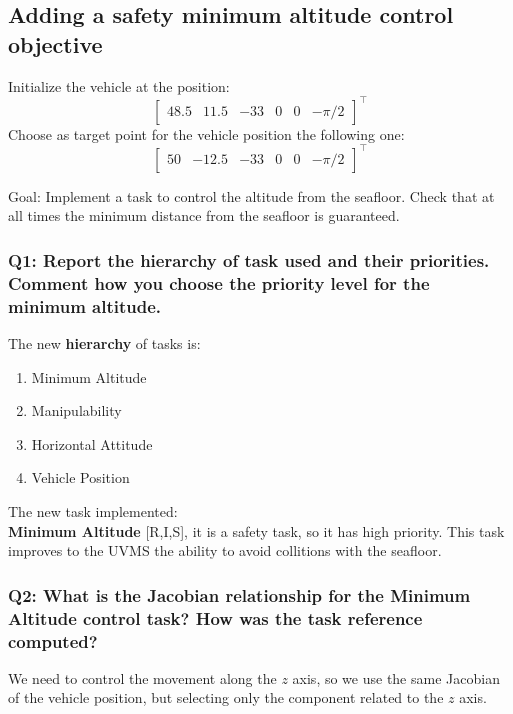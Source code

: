 \documentclass{article}
\begin{document}
\subsection{Adding a safety minimum altitude control objective}
Initialize the vehicle at the position:
\begin{displaymath}
\begin{bmatrix} 48.5 & 11.5 & -33 & 0 & 0 &-\pi/2\end{bmatrix}^\top
\end{displaymath} 
Choose as target point for the vehicle position the following one:
\begin{displaymath}
\begin{bmatrix} 50 & -12.5 & -33 & 0 & 0 &-\pi/2 \end{bmatrix}^\top
\end{displaymath}

Goal: Implement a task to control the altitude from the seafloor. Check that at all times the minimum distance from the seafloor is guaranteed.

\subsubsection{Q1: Report the hierarchy of task used and their priorities. Comment how you choose the priority level for the minimum altitude.}

\noindent
\vspace{5px}
The new \textbf{hierarchy} of tasks is:
\begin{enumerate}
	\item Minimum Altitude
	\item Manipulability
	\item Horizontal Attitude
	\item Vehicle Position
\end{enumerate}

\noindent
\vspace{5px}
The new task implemented: \\
\textbf{Minimum Altitude} [R,I,S], it is a safety task, so it has high priority. This task improves to the UVMS the ability to avoid collitions with the seafloor.

\subsubsection{Q2: What is the Jacobian relationship for the Minimum Altitude control task? How was the task reference computed?}
We need to control the movement along the $z$ axis, so we use the same Jacobian of the vehicle position, but selecting only the component related to the $z$ axis.
\end{document}
